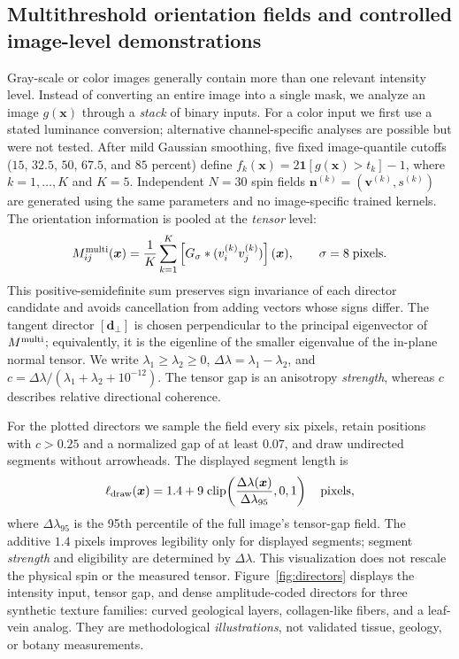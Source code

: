 \documentclass[11pt,a4paper]{article}
\newcommand{\nn}{\bm n}
\newcommand{\vv}{\bm v}
\newcommand{\xx}{\bm x}
\begin{document}
\subsection{Multithreshold orientation fields and controlled image-level demonstrations}\label{subsec:impl:imagepilot}
Gray-scale or color images generally contain more than one relevant intensity level. Instead of converting an entire image into a single mask, we analyze an image $g(\xx)$ through a \emph{stack} of binary inputs. For a color input we first use a stated luminance conversion; alternative channel-specific analyses are possible but were not tested. After mild Gaussian smoothing, five fixed image-quantile cutoffs ($15$, $32.5$, $50$, $67.5$, and $85$ percent) define $f_k(\xx)=2\mathbf{1}[g(\xx)>t_k]-1$, where $k=1,\ldots,K$ and $K=5$. Independent $N=30$ spin fields $\nn^{(k)}=(\vv^{(k)},s^{(k)})$ are generated using the same parameters and no image-specific trained kernels. The orientation information is pooled at the \emph{tensor} level:
\begin{equation}
 M^{\rm multi}_{ij}(\xx)=\frac{1}{K}\sum_{k=1}^{K}
 \left[G_\sigma*(v^{(k)}_i v^{(k)}_j)\right](\xx),
 \qquad \sigma=8\;\text{pixels}.
 \label{eq:multiimage}
\end{equation}
This positive-semidefinite sum preserves sign invariance of each director candidate and avoids cancellation from adding vectors whose signs differ. The tangent director $[\bm d_\perp]$ is chosen perpendicular to the principal eigenvector of $M^{\rm multi}$; equivalently, it is the eigenline of the smaller eigenvalue of the in-plane normal tensor. We write $\lambda_1\ge\lambda_2\ge0$, $\Delta\lambda=\lambda_1-\lambda_2$, and $c=\Delta\lambda/(\lambda_1+\lambda_2+10^{-12})$. The tensor gap is an anisotropy \emph{strength}, whereas $c$ describes relative directional coherence.

For the plotted directors we sample the field every six pixels, retain positions with $c>0.25$ and a normalized gap of at least $0.07$, and draw undirected segments without arrowheads. The displayed segment length is
\begin{equation}
 \ell_{\rm draw}(\xx)=1.4+9\;\mathrm{clip}\!\left(\frac{\Delta\lambda(\xx)}{\Delta\lambda_{95}},0,1\right)
 \quad\text{pixels},
 \label{eq:segmentlength}
\end{equation}
where $\Delta\lambda_{95}$ is the 95th percentile of the full image's tensor-gap field. The additive $1.4$ pixels improves legibility only for displayed segments; segment \emph{strength} and eligibility are determined by $\Delta\lambda$. This visualization does not rescale the physical spin or the measured tensor. Figure~\ref{fig:directors} displays the intensity input, tensor gap, and dense amplitude-coded directors for three synthetic texture families: curved geological layers, collagen-like fibers, and a leaf-vein analog. They are methodological \emph{illustrations}, not validated tissue, geology, or botany measurements.
\end{document}
